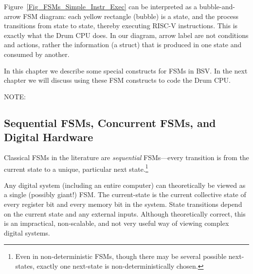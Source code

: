 Figure~\ref{Fig_FSMs_Simple_Instr_Exec} can be interpreted as a
bubble-and-arrow FSM diagram: each yellow rectangle (bubble) is a
state, and the process transitions from state to state, thereby
executing RISC-V instructions.  This is exactly what the Drum CPU
does.  In our diagram, arrow label are not conditions and actions,
rather the information (a struct) that is produced in one state and
consumed by another.

In this chapter we describe some special constructs for FSMs in BSV.
In the next chapter we will discuss using these FSM constructs to code
the Drum CPU.

\vspace{2ex}

NOTE:


\subsection{Sequential FSMs, Concurrent FSMs, and Digital Hardware}


Classical FSMs in the literature are \emph{sequential} FSMs---every
transition is from the current state to a unique, particular next
state.\footnote{Even in non-deterministic FSMs, though there may be
several possible next-states, exactly one next-state is
non-deterministically chosen.}

Any digital system (including an entire computer) can theoretically be
viewed as a single (possibly giant!) FSM.  The current-state is the
current collective state of every register bit and every memory bit in
the system.  State transitions depend on the current state and any
external inputs.  Although theoretically correct, this is an
impractical, non-scalable, and not very useful way of viewing complex
digital systems.

